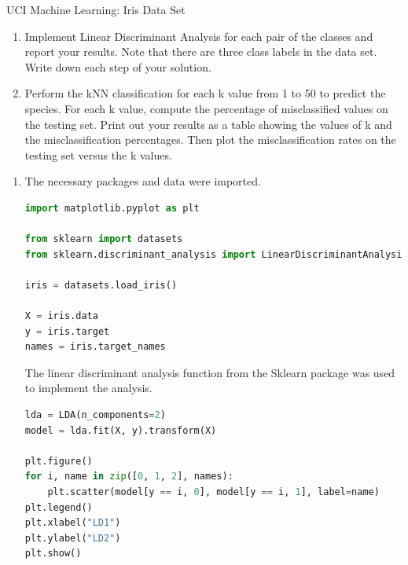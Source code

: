 \documentclass{homework}
\begin{document}
\begin{solution}
\begin{solution}
\end{solution}

\newpage
\begin{problem}
    UCI Machine Learning: Iris Data Set 
    
    \begin{enumerate}[label=\alph*.]
        \item Implement Linear Discriminant Analysis for each pair of the classes and report your results. Note that there are three class labels in the data set. Write down each step of your solution.  
 
        \item Perform the kNN classification for each k value from 1 to 50 to predict the species. For each k value, compute the percentage of misclassified values on the testing set. Print out your results as a table showing the values of k and the misclassification percentages. Then plot the misclassification rates on the testing set versus the k values. 
    \end{enumerate}
\end{problem}

\begin{solution}

\begin{enumerate}[label=\alph*.]
    \item The necessary packages and data were imported. 

\begin{lstlisting}[language=Python]
import matplotlib.pyplot as plt

from sklearn import datasets
from sklearn.discriminant_analysis import LinearDiscriminantAnalysis as LDA

iris = datasets.load_iris()

X = iris.data
y = iris.target
names = iris.target_names
\end{lstlisting}

The linear discriminant analysis function from the Sklearn package was used to implement the analysis.  

\begin{lstlisting}[language=Python, firstnumber=12]
lda = LDA(n_components=2)
model = lda.fit(X, y).transform(X)

plt.figure()
for i, name in zip([0, 1, 2], names):
    plt.scatter(model[y == i, 0], model[y == i, 1], label=name)
plt.legend()
plt.xlabel("LD1")
plt.ylabel("LD2")
plt.show()
\end{lstlisting}


\end{enumerate}
\end{solution}
\end{solution}
\end{document}
